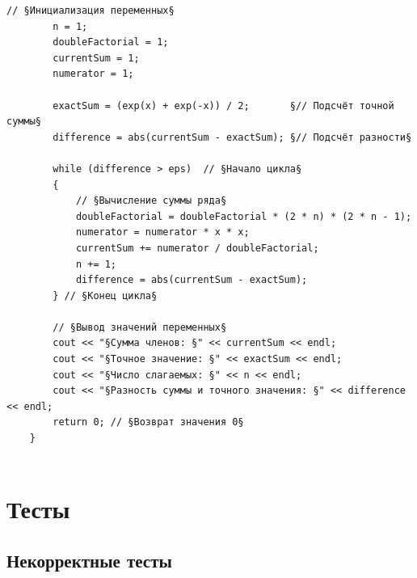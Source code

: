 \documentclass[a4paper]{article}
\begin{document}
\begin{lstlisting}[style={CppCodeStyle}]
		// §Инициализация переменных§
		n = 1;
		doubleFactorial = 1;
		currentSum = 1;
		numerator = 1;
		
		exactSum = (exp(x) + exp(-x)) / 2;       §// Подсчёт точной суммы§
		difference = abs(currentSum - exactSum); §// Подсчёт разности§
		
		while (difference > eps)  // §Начало цикла§
		{
			// §Вычисление суммы ряда§
			doubleFactorial = doubleFactorial * (2 * n) * (2 * n - 1);
			numerator = numerator * x * x;
			currentSum += numerator / doubleFactorial;
			n += 1;
			difference = abs(currentSum - exactSum);
		} // §Конец цикла§
		
		// §Вывод значений переменных§
		cout << "§Сумма членов: §" << currentSum << endl;
		cout << "§Точное значение: §" << exactSum << endl;
		cout << "§Число слагаемых: §" << n << endl;
		cout << "§Разность суммы и точного значения: §" << difference << endl;
		return 0; // §Возврат значения 0§
	}
	
	\end{lstlisting}
	\newpage
	
	\section{Тесты}
	\subsection{Некорректные тесты}
	
\end{document}
